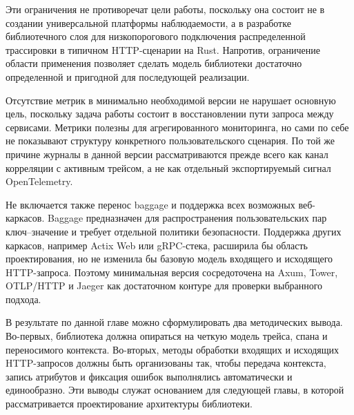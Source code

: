 Эти ограничения не противоречат цели работы, поскольку она состоит не в создании
универсальной платформы наблюдаемости, а в разработке библиотечного слоя для
низкопорогового подключения распределенной трассировки в типичном HTTP-сценарии
на Rust. Напротив, ограничение области применения позволяет сделать модель
библиотеки достаточно определенной и пригодной для последующей реализации.

Отсутствие метрик в минимально необходимой версии не нарушает основную цель,
поскольку задача работы состоит в восстановлении пути запроса между сервисами.
Метрики полезны для агрегированного мониторинга, но сами по себе не показывают
структуру конкретного пользовательского сценария. По той же причине журналы в
данной версии рассматриваются прежде всего как канал корреляции с активным
трейсом, а не как отдельный экспортируемый сигнал OpenTelemetry.

Не включается также перенос baggage и поддержка всех возможных веб-каркасов.
Baggage предназначен для распространения пользовательских пар ключ--значение и
требует отдельной политики безопасности. Поддержка других каркасов, например
Actix Web или gRPC-стека, расширила бы область проектирования, но не изменила бы
базовую модель входящего и исходящего HTTP-запроса. Поэтому минимальная версия
сосредоточена на Axum, Tower, OTLP/HTTP и Jaeger как достаточном контуре для
проверки выбранного подхода.

В результате по данной главе можно сформулировать два методических вывода. Во-первых,
библиотека должна опираться на четкую модель трейса, спана и переносимого
контекста. Во-вторых, методы обработки входящих и исходящих HTTP-запросов должны
быть организованы так, чтобы передача контекста, запись атрибутов и фиксация
ошибок выполнялись автоматически и единообразно. Эти выводы служат основанием для
следующей главы, в которой рассматривается проектирование архитектуры библиотеки.
